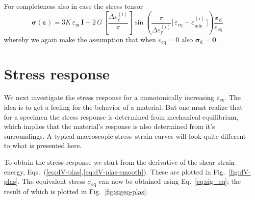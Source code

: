 \documentclass[times,namecite]{goose-article}
\begin{document}
For completeness also in case the stress tensor
\begin{equation}
  \bm{\sigma} ( \bm{\varepsilon} )
  =
  3 K \, \varepsilon_\mathrm{m} \, \bm{I}
  +
  2 \, G \,
  \left[ \frac{\Delta \varepsilon_\mathrm{y}^{(i)}}{\pi} \right]
  \sin \left(
    \frac{ \pi }{ \Delta \varepsilon_\mathrm{y}^{(i)} }
    \Big[\, \varepsilon_\mathrm{eq} - \varepsilon_\mathrm{min}^{(i)} \,\Big]
  \right)
  \frac{\bm{\varepsilon}_\mathrm{d}}{\varepsilon_\mathrm{eq}}
\end{equation}
whereby we again make the assumption that when $\varepsilon_\mathrm{eq} = 0$ also $\bm{\sigma}_\mathrm{d} = \bm{0}$.

\section{Stress response}

We next investigate the stress response for a monotonically increasing $\varepsilon_\mathrm{eq}$. The idea is to get a feeling for the behavior of a material. But one must realize that for a specimen the stress response is determined from mechanical equilibrium, which implies that the material's response is also determined from it's surroundings. A typical macroscopic stress--strain curves will look quite different to what is presented here.

To obtain the stress response we start from the derivative of the shear strain energy, Eqs.~(\ref{eq:dV-plas},\ref{eq:dV-plas-smooth}). These are plotted in Fig.~\ref{fig:dV-plas}. The equivalent stress $\sigma_\mathrm{eq}$ can now be obtained using Eq.~\eqref{eq:sig_eq}; the result of which is plotted in Fig.~\ref{fig:sigeq-plas}.
\end{document}
